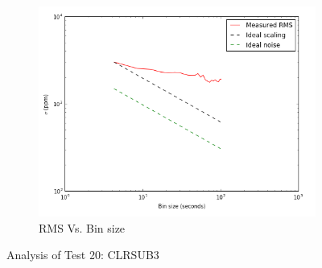 \documentclass[conference]{IEEEtran}
\begin{document}
\begin{figure}[H]
    \begin{subfigure}{3}
        \includegraphics[scale=0.6]{rms_test20}
        \caption{RMS Vs. Bin size}
    \end{subfigure}
    \caption{Analysis of Test 20: CLRSUB3}
\end{figure}
\end{document}
